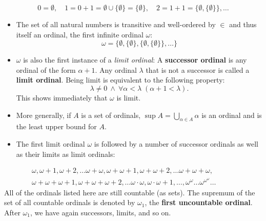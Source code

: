 \begin{equation}
0 = \emptyset, \quad 1 = 0 + 1 = \emptyset \cup \{\emptyset\} = \{\emptyset\}, \quad 2 = 1+1 = \{\emptyset, \{\emptyset\} \}, \dots
\end{equation}

\begin{itemize}
\item The set of all natural numbers is transitive and well-ordered by $\in$ and thus itself an ordinal, the first infinite ordinal $\omega$:
\begin{equation}

  \omega = \{\emptyset, \{\emptyset\}, \{\emptyset, \{\emptyset\}\}, \dots \}
\end{equation}


\item $\omega$ is also the first instance of a \textit{limit ordinal}: A \textbf{successor ordinal} is any ordinal of the form $\alpha+1$. Any ordinal $\lambda$ that is not a successor is called a \textbf{limit ordinal}. Being limit is equivalent to the following property:
\begin{equation}

\lambda \neq 0 \: \wedge \: \forall \alpha < \lambda \; (\alpha+1 < \lambda).
\end{equation}
This shows immediately that $\omega$ is limit.


\item More generally, if $A$ is a set of ordinals, $\sup A = \bigcup_{\alpha \in A} \alpha$ is an ordinal and is the least upper bound for $A$.


\item The first limit ordinal $\omega$ is followed by a number of successor ordinals as well as their limits as limit ordinals:
\end{itemize}
\begin{gather*}
\omega, \omega+1, \omega+2, \ldots \omega+\omega, \omega+\omega+1, \omega + \omega+2, \ldots \omega+\omega+ \omega, \qquad \quad \\ \omega + \omega+ \omega+1, \omega + \omega+ \omega+2, \ldots  \omega \cdot \omega,  \omega \cdot \omega +1,\ldots, \omega^{\omega} \ldots \omega^{\omega^{\omega}} \ldots
\end{gather*}
All of the ordinals listed here are still countable (as sets). The supremum of the set of all countable ordinals is denoted by $\omega_1$, the \textbf{first uncountable ordinal}. After $\omega_1$, we have again successors, limits, and so on.

